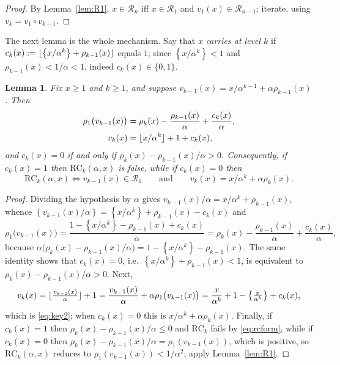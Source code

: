 \documentclass[11pt]{amsart}
\newtheorem{lemma}[theorem]{Lemma}
\theoremstyle{remark}
\DeclarePairedDelimiter{\fl}{\lfloor}{\rfloor}
\newcommand{\fp}[1]{\left\{#1\right\}}
\newcommand{\RC}{\mathrm{RC}}
\begin{document}
\begin{proof}
By Lemma~\ref{lem:R1}, $x\in\mathcal R_{n}$ iff $x\in\mathcal R_1$ and
$v_1(x)\in\mathcal R_{n-1}$; iterate, using $v_k=v_1\circ v_{k-1}$.
\end{proof}

The next lemma is the whole mechanism. Say that $x$ \emph{carries at level $k$} if
$c_k(x):=\fl{\fp{x/\alpha^{k}}+\rho_{k-1}(x)}$ equals $1$; since
$\fp{x/\alpha^{k}}<1$ and $\rho_{k-1}(x)<1/\alpha<1$, indeed $c_k(x)\in\{0,1\}$.

\begin{lemma}\label{lem:key}
Fix $x\ge1$ and $k\ge1$, and suppose
$v_{k-1}(x)=x/\alpha^{k-1}+\alpha\rho_{k-1}(x)$. Then
\begin{align}
 \rho_1\bigl(v_{k-1}(x)\bigr)
 &=\rho_k(x)-\frac{\rho_{k-1}(x)}{\alpha}+\frac{c_k(x)}{\alpha},
 \label{eq:key1}\\
 v_k(x)&=\fl{x/\alpha^{k}}+1+c_k(x),
 \label{eq:key2}
\end{align}
and $c_k(x)=0$ if and only if $\rho_k(x)-\rho_{k-1}(x)/\alpha>0$. Consequently, if
$c_k(x)=1$ then $\RC_k(\alpha,x)$ is false, while if $c_k(x)=0$ then
\[
 \RC_k(\alpha,x)\iff v_{k-1}(x)\in\mathcal R_1
 \qquad\text{and}\qquad
 v_k(x)=x/\alpha^{k}+\alpha\rho_k(x).
\]
\end{lemma}

\begin{proof}
Dividing the hypothesis by $\alpha$ gives
$v_{k-1}(x)/\alpha=x/\alpha^{k}+\rho_{k-1}(x)$, whence
$\fp{v_{k-1}(x)/\alpha}=\fp{x/\alpha^{k}}+\rho_{k-1}(x)-c_k(x)$ and
\[
 \rho_1\bigl(v_{k-1}(x)\bigr)
 =\frac{1-\fp{x/\alpha^{k}}-\rho_{k-1}(x)+c_k(x)}{\alpha}
 =\rho_k(x)-\frac{\rho_{k-1}(x)}{\alpha}+\frac{c_k(x)}{\alpha},
\]
because $\alpha\bigl(\rho_k(x)-\rho_{k-1}(x)/\alpha\bigr)
=1-\fp{x/\alpha^{k}}-\rho_{k-1}(x)$. The same identity shows that $c_k(x)=0$, i.e.\
$\fp{x/\alpha^{k}}+\rho_{k-1}(x)<1$, is equivalent to
$\rho_k(x)-\rho_{k-1}(x)/\alpha>0$. Next,
\[
 v_k(x)=\fl{\tfrac{v_{k-1}(x)}\alpha}+1
 =\frac{v_{k-1}(x)}\alpha+\alpha\rho_1\bigl(v_{k-1}(x)\bigr)
 =\frac{x}{\alpha^{k}}+1-\fp{\tfrac{x}{\alpha^{k}}}+c_k(x),
\]
which is \eqref{eq:key2}; when $c_k(x)=0$ this is
$x/\alpha^{k}+\alpha\rho_k(x)$. Finally, if $c_k(x)=1$ then
$\rho_k(x)-\rho_{k-1}(x)/\alpha\le0$ and $\RC_k$ fails by \eqref{eq:rcform}, while if
$c_k(x)=0$ then $\rho_k(x)-\rho_{k-1}(x)/\alpha=\rho_1(v_{k-1}(x))$, which is positive,
so $\RC_k(\alpha,x)$ reduces to $\rho_1(v_{k-1}(x))<1/\alpha^{2}$; apply
Lemma~\ref{lem:R1}.
\end{proof}
\end{document}
